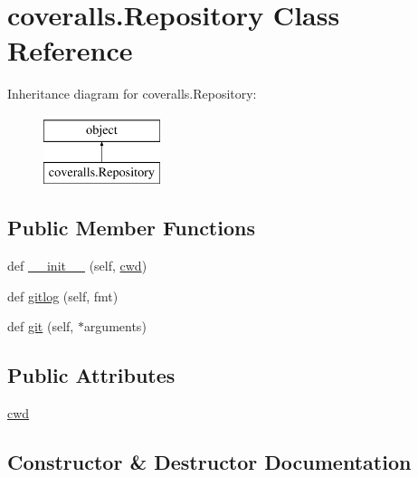 \hypertarget{classcoveralls_1_1Repository}{}\section{coveralls.\+Repository Class Reference}
\label{classcoveralls_1_1Repository}
Inheritance diagram for coveralls.\+Repository\+:\begin{figure}[H]
\begin{center}
\leavevmode
\includegraphics[height=2.000000cm]{classcoveralls_1_1Repository}
\end{center}
\end{figure}
\subsection*{Public Member Functions}
\begin{DoxyCompactItemize}
\item 
def \mbox{\hyperlink{classcoveralls_1_1Repository_ac7c77dbf7f8647d3bd3a0e847015b808}{\+\_\+\+\_\+init\+\_\+\+\_\+}} (self, \mbox{\hyperlink{classcoveralls_1_1Repository_a11e205dc56f17f34fdb8f737f62aa8f9}{cwd}})
\item 
def \mbox{\hyperlink{classcoveralls_1_1Repository_a91d73f9476ff6c02d0baf68bbeed8779}{gitlog}} (self, fmt)
\item 
def \mbox{\hyperlink{classcoveralls_1_1Repository_a64be8a51048982d129efd26b4b2a14ee}{git}} (self, $\ast$arguments)
\end{DoxyCompactItemize}
\subsection*{Public Attributes}
\begin{DoxyCompactItemize}
\item 
\mbox{\hyperlink{classcoveralls_1_1Repository_a11e205dc56f17f34fdb8f737f62aa8f9}{cwd}}
\end{DoxyCompactItemize}


\subsection{Constructor \& Destructor Documentation}
\mbox{\label{classcoveralls_1_1Repository_ac7c77dbf7f8647d3bd3a0e847015b808}} 
